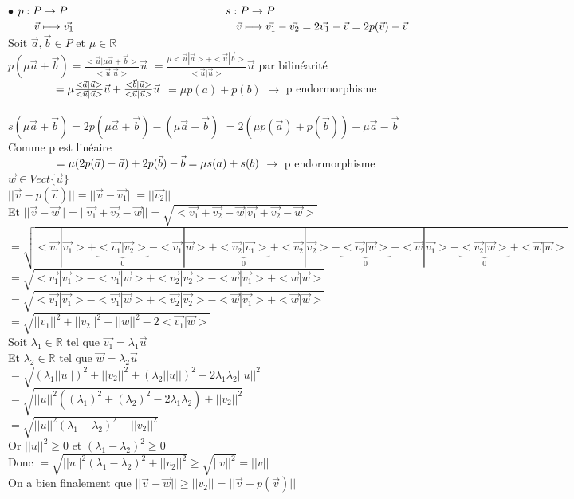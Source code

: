 \documentclass{article}
\newcommand\tab[1][1cm]{\hspace*{#1}}
\begin{document}
\noindent $\bullet$ $p : P \rightarrow P \tab[5cm] s : P \rightarrow P$\\
$\tab[0.8cm] \vec{v} \longmapsto \vec{v_1} \tab[5.2cm] \vec{v} \longmapsto \vec{v_1} - \vec{v_2} = 2\vec{v_1} - \vec{v} = 2p(\vec{v}) - \vec{v}$\\
Soit $\vec{a}, \vec{b} \in P$ et $\mu \in \mathbb{R}$\\
$p(\mu \vec{a} + \vec{b}) = \frac{<\vec{u}|\mu \vec{a} + \vec{b}>}{<\vec{u}|\vec{u}>}\vec{u}$
$=\frac{\mu <\vec{u}|\vec{a}> + <\vec{u}|\vec{b}>}{<\vec{u}|\vec{u}>}\vec{u}$ \tab[2mm] par bilinéarité\\
$\tab[15mm] =\mu \frac{<\vec{a}|\vec{u}>}{<\vec{u}|\vec{u}>}\vec{u} + \frac{<\vec{b}|\vec{u}>}{<\vec{u}|\vec{u}>}\vec{u}$
$=\mu p(a) + p(b)$ $\rightarrow$ p endormorphisme\\
\\
$s(\mu \vec{a} + \vec{b}) = 2p(\mu \vec{a} + \vec{b}) - (\mu \vec{a} + \vec{b})$
$=2 (\mu p(\vec{a}) + p(\vec{b})) - \mu \vec{a} - \vec{b}$ \tab[2mm] Comme p est linéaire\\
$\tab[15mm] = \mu (2p(\vec{a}) - \vec{a}) +  2p(\vec{b}) - \vec{b} = \mu s(a) + s(b)$ $\rightarrow$ p endormorphisme\\
$\vec{w} \in Vect\{\vec{u}\}$\\
$||\vec{v} - p(\vec{v})|| = ||\vec{v} - \vec{v_1}|| = ||\vec{v_2}||$\\
Et $||\vec{v} - \vec{w}|| = ||\vec{v_1} + \vec{v_2} - \vec{w}|| = \sqrt{<\vec{v_1} + \vec{v_2} - \vec{w}|\vec{v_1} + \vec{v_2} - \vec{w}>}$\\
$= \sqrt{<\vec{v_1}|\vec{v_1}> + \underset{0}{\underbrace{<\vec{v_1}|\vec{v_2}>}} - <\vec{v_1}|\vec{w}> + \underset{0}{\underbrace{<\vec{v_2}|\vec{v_1}>}} + <\vec{v_2}|\vec{v_2}> - \underset{0}{\underbrace{<\vec{v_2}|\vec{w}>}} - <\vec{w}|\vec{v_1}> - \underset{0}{\underbrace{<\vec{v_2}|\vec{w}>}} + <\vec{w}|\vec{w}>}$
$= \sqrt{<\vec{v_1}|\vec{v_1}> - <\vec{v_1}|\vec{w}> + <\vec{v_2}|\vec{v_2}> - <\vec{w}|\vec{v_1}> + <\vec{w}|\vec{w}>}$\\
$= \sqrt{<\vec{v_1}|\vec{v_1}> - <\vec{v_1}|\vec{w}> + <\vec{v_2}|\vec{v_2}> - <\vec{w}|\vec{v_1}> + <\vec{w}|\vec{w}>}$\\
$= \sqrt{||v_1||^2 + ||v_2||^2 + ||w||^2 - 2<\vec{v_1}|\vec{w}>}$\\
Soit $\lambda_1 \in \mathbb{R}$ tel que $\vec{v_1} = \lambda_1 \vec{u}$\\
Et $\lambda_2 \in \mathbb{R}$ tel que $\vec{w} = \lambda_2 \vec{u}$\\
$= \sqrt{(\lambda_1||u||)^2 + ||v_2||^2 + (\lambda_2||u||)^2 - 2 \lambda_1 \lambda_2 ||u||^2}$\\
$= \sqrt{||u||^2((\lambda_1)^2 + (\lambda_2)^2 - 2 \lambda_1 \lambda_2) + ||v_2||^2}$\\
$= \sqrt{||u||^2(\lambda_1 - \lambda_2)^2 + ||v_2||^2}$\\
Or $||u||^2 \geq 0$ et $(\lambda_1 - \lambda_2)^2 \geq 0$\\
Donc $= \sqrt{||u||^2(\lambda_1 - \lambda_2)^2 + ||v_2||^2} \geq \sqrt{||v||^2} = ||v||$\\
On a bien finalement que $||\vec{v} - \vec{w}|| \geq ||v_2|| = ||\vec{v} - p(\vec{v})||$
\end{document}
